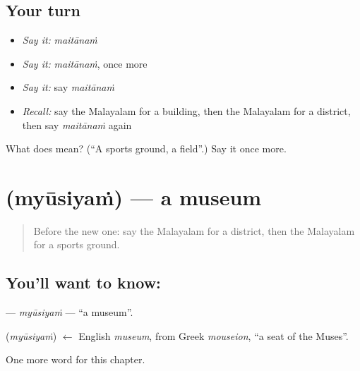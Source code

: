 \subsection*{Your turn}
\begin{itemize}
\raggedright
  \item \emph{Say it:} \emph{maitānaṁ}
  \item \emph{Say it:} \emph{maitānaṁ}, once more
  \item \emph{Say it:} say \emph{maitānaṁ}
  \item \emph{Recall:} say the Malayalam for a building, then the Malayalam for a district, then say \emph{maitānaṁ} again
\end{itemize}

\begin{tcolorbox}[breakable,colback=teal!4,colframe=teal!35!black,title={Before you move on}]
What does  mean? (\textquotedblleft{}A sports ground, a field\textquotedblright{}.) Say it once more.
\end{tcolorbox}
\section[\texorpdfstring{\ml{മ്യൂസിയം} (myūsiyaṁ)}{മ്യൂസിയം (myūsiyaṁ)}]{ (myūsiyaṁ) — a museum}

\label{lesson:ML-C279-myusiyam}



\begin{quote}
Before the new one: say the Malayalam for a district, then the Malayalam for a sports ground.
\end{quote}

\subsection*{You'll want to know: }
\textbf{} — \emph{myūsiyaṁ} — \textquotedblleft{}a museum\textquotedblright{}.

\begin{cousinweb}
\textbf{} (\emph{myūsiyaṁ}) $\leftarrow$ English \emph{museum}, from Greek \emph{mouseion}, \textquotedblleft{}a seat of the Muses\textquotedblright{}.
\end{cousinweb}

\begin{grammarlens}[title={What you've built}]
One more word for this chapter.
\end{grammarlens}


